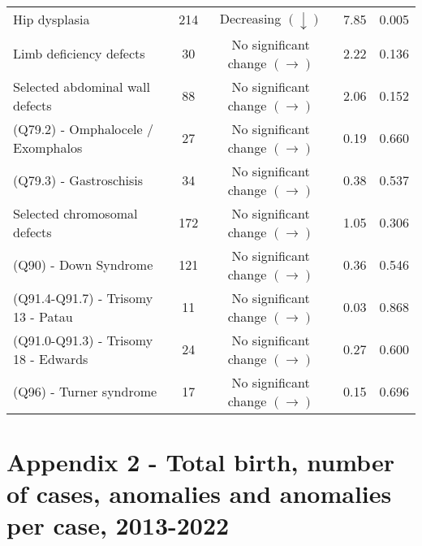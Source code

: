 \documentclass[
]{krantz}
\begin{document}
\begin{longtable}[t]{>{\raggedright\arraybackslash}p{4cm}cccc}
Hip dysplasia & 214 & Decreasing $\left(\downarrow \right)$ & 7.85 & 0.005\\
\addlinespace
Limb deficiency defects & 30 & \makecell[c]{No significant \\ change $\left(\rightarrow \right)$} & 2.22 & 0.136\\
Selected abdominal wall defects & 88 & \makecell[c]{No significant \\ change $\left(\rightarrow \right)$} & 2.06 & 0.152\\
(Q79.2) - Omphalocele / Exomphalos & 27 & \makecell[c]{No significant \\ change $\left(\rightarrow \right)$} & 0.19 & 0.660\\
(Q79.3) - Gastroschisis & 34 & \makecell[c]{No significant \\ change $\left(\rightarrow \right)$} & 0.38 & 0.537\\
Selected chromosomal defects & 172 & \makecell[c]{No significant \\ change $\left(\rightarrow \right)$} & 1.05 & 0.306\\
\addlinespace
(Q90) - Down Syndrome & 121 & \makecell[c]{No significant \\ change $\left(\rightarrow \right)$} & 0.36 & 0.546\\
(Q91.4-Q91.7) - Trisomy 13 - Patau & 11 & \makecell[c]{No significant \\ change $\left(\rightarrow \right)$} & 0.03 & 0.868\\
(Q91.0-Q91.3) - Trisomy 18 - Edwards & 24 & \makecell[c]{No significant \\ change $\left(\rightarrow \right)$} & 0.27 & 0.600\\
(Q96) - Turner syndrome & 17 & \makecell[c]{No significant \\ change $\left(\rightarrow \right)$} & 0.15 & 0.696\\*
\end{longtable}
\endgroup{}

\clearpage

\hypertarget{section-a2}{%
\section{Appendix 2 - Total birth, number of cases, anomalies and anomalies per case, 2013-2022}\label{section-a2}}

\begingroup\fontsize{8}{10}\selectfont
\end{document}
